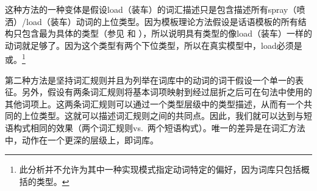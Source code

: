 \begin{exe}
\begin{xlist}[iv.]
\begin{exe}
\begin{xlist}[iv.]
这种方法的一种变体是假设load（装车）的词汇描述只是包含描述所有spray（喷洒）/load（装车）动词的上位类型。因为模板理论方法假设是话语模板的所有结构只包含最为具体的类型（参见 和 ），所以说明具有类型的像load（装车）一样的动词就足够了。因为这个类型有两个下位类型，所以在真实模型中，load必须是或。\footnote{%
	此分析并不允许为其中一种实现模式指定动词特定的偏好，因为词库只包括概括的类型。
}

第二种方法是坚持词汇规则并且为列举在词库中的动词的词干假设一个单一的表征。另外，假设有两条词汇规则将基本词项映射到经过屈折之后可在句法中使用的其他词项上。这两条词汇规则可以通过一个类型层级中的类型描述，从而有一个共同的上位类型。这就可以描述词汇规则之间的共同点。因此，我们就可以达到与短语构式相同的效果（两个词汇规则vs.\ 两个短语构式）。唯一的差异是在词汇方法中，动作在一个更深的层级上，即词库\citep[--406]{Mueller2002b}。


\end{xlist}
\end{exe}
\end{xlist}
\end{exe}
